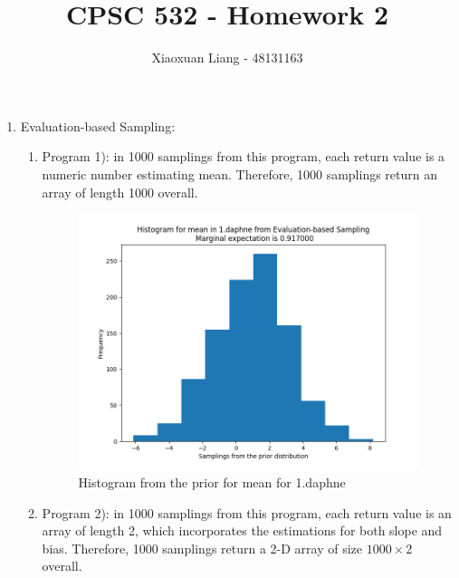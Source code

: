 \documentclass{article}
\title{ \normalfont \normalsize 
\huge CPSC 532 - Homework 2}
\date{}
\author{Xiaoxuan Liang - 48131163}
\begin{document}
\maketitle

\begin{enumerate}
\item Evaluation-based Sampling:
\begin{enumerate}
\item Program 1): in 1000 samplings from this program,  each return value is a numeric number estimating mean. Therefore, 1000 samplings return an array of length 1000 overall.
\begin{figure}[!htp]
	\centering
	\includegraphics[scale=0.4]{../figs/evaluation_1.png}
	\caption{Histogram from the prior for mean for 1.daphne}
\end{figure}
\item Program 2): in 1000 samplings from this program,  each return value is an array of length 2,  which incorporates the estimations for both slope and bias. Therefore, 1000 samplings return a 2-D array of size $1000\times 2$ overall.
\begin{figure}[!htp] 
    \centering
\end{figure}
\end{enumerate}
\end{enumerate}
\end{document}
